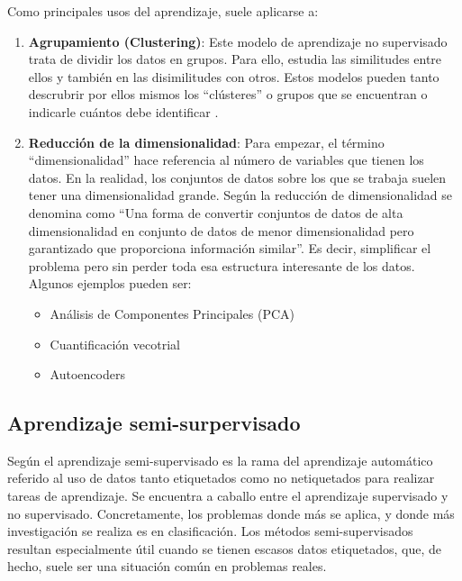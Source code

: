 Como principales usos del aprendizaje, suele aplicarse a:
\vspace{-1.5px}
\begin{enumerate}
    \item \textbf{Agrupamiento (Clustering)}: Este modelo de aprendizaje no
    supervisado trata de dividir los datos en grupos. Para ello, estudia las
    similitudes entre ellos y también en las disimilitudes con otros. Estos
    modelos pueden tanto descrubrir por ellos mismos los ``clústeres'' o grupos
    que se encuentran o indicarle cuántos debe identificar \cite{salim:usl}.
    \item \textbf{Reducción de la dimensionalidad}: Para empezar, el término
    ``dimensionalidad'' hace referencia al número de variables que tienen los
    datos. En la realidad, los conjuntos de datos sobre los que se trabaja
    suelen tener una dimensionalidad grande. Según
    \cite{javatpoint:reduccionsdims} la reducción de dimensionalidad se denomina
    como ``Una forma de convertir conjuntos de datos de alta dimensionalidad en
    conjunto de datos de menor dimensionalidad pero garantizado que proporciona
    información similar''. Es decir, simplificar el problema pero sin perder
    toda esa estructura interesante de los datos. Algunos ejemplos pueden ser:
    \begin{itemize}
        \item Análisis de Componentes Principales (PCA)
        \item Cuantificación vecotrial
        \item Autoencoders
    \end{itemize}
\end{enumerate}


\subsection{Aprendizaje semi-surpervisado}

Según \cite{vanEngelen2020} el aprendizaje semi-supervisado es la rama del
aprendizaje automático referido al uso de datos tanto etiquetados como no
netiquetados para realizar tareas de aprendizaje. Se encuentra a caballo  entre
el aprendizaje supervisado y no supervisado. Concretamente, los problemas donde
más se aplica, y donde más investigación se realiza es en clasificación. Los
métodos semi-supervisados resultan especialmente útil cuando se tienen escasos
datos etiquetados, que, de hecho, suele ser una situación común en problemas reales.

